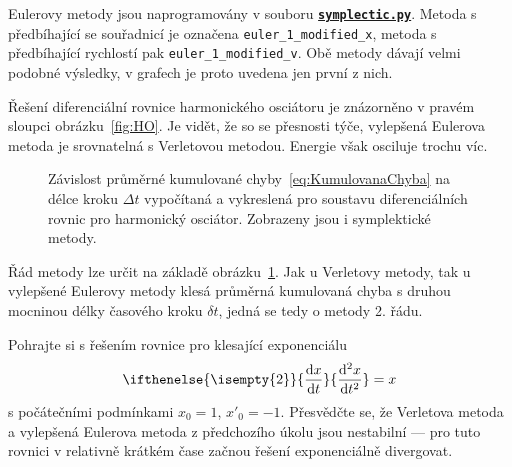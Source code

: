 \documentclass[a4paper,11pt,twoside]{article}
\renewcommand{\d}{\mathrm{d}}           %
\newcommand{\derivative}[3][]{\ifthenelse{\isempty{#1}}	    %
	{\frac{\d{#2}}{\d{#3}}}
	{\frac{\d^{#1}{#2}}{\d{#3}^{#1}}}
}
\def\code#1{\textnormal{\texttt{#1}}}
\def\ghfile#1#2{\textnormal{\textbf{\texttt{\href{https://github.com/PavelStransky/PCInPhysics/blob/main/#1#2}{#2}}}}}
\theoremstyle{red}
\theoremstyle{green}
\begin{document}
\begin{solution}
     Eulerovy metody jsou naprogramovány v souboru \ghfile{python/ode/}{symplectic.py}.
    Metoda s předbíhající se souřadnicí je označena \code{euler_1_modified_x}, metoda s předbíhající rychlostí pak \code{euler_1_modified_v}.
    Obě metody dávají velmi podobné výsledky, v grafech je proto uvedena jen první z nich.

    Řešení diferenciální rovnice harmonického osciátoru je znázorněno v pravém sloupci obrázku~\ref{fig:HO}.
    Je vidět, že so se přesnosti týče, vylepšená Eulerova metoda je srovnatelná s Verletovou metodou.
    Energie však osciluje trochu víc.

    \begin{figure}[!htbp]
        \centering{}
        \caption{
            \protect\small
            Závislost průměrné kumulované chyby~\eqref{eq:KumulovanaChyba} na délce kroku $\Delta t$ vypočítaná a vykreslená pro soustavu diferenciálních rovnic pro harmonický osciátor.
            Zobrazeny jsou i symplektické metody.
        }
        \label{fig:ho_chyba}
    \end{figure}
    
    Řád metody lze určit na základě obrázku~\ref{fig:ho_chyba}.
    Jak u Verletovy metody, tak u vylepšené Eulerovy metody klesá průměrná kumulovaná chyba s druhou mocninou délky časového kroku $\delta t$, jedná se tedy o metody 2. řádu.
\end{solution}


\begin{solved}
    Pohrajte si s řešením rovnice pro klesající exponenciálu
    \begin{equation}\label{eq:Exp2}
        \derivative[2]{x}{t}=x
    \end{equation}
    s počátečními podmínkami $x_{0}=1$, $x'_{0}=-1$.
    Přesvědčte se, že Verletova metoda a vylepšená Eulerova metoda z předchozího úkolu jsou nestabilní --- pro tuto rovnici v relativně krátkém čase začnou řešení exponenciálně divergovat.
\end{solved}
\end{document}
